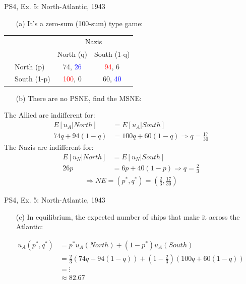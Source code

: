 \begin{frame}{PS4, Ex. 5: North-Atlantic, 1943}
    \begin{itemize}
      \item[(a)] It's a zero-sum (100-sum) type game:
    \end{itemize}
    \vspace{-15pt}
    \hspace{-15pt}\begin{table}
      \begin{tabular}{cl|c|c|}
          & \multicolumn{1}{c}{} & \multicolumn{2}{c}{\color{blue}Nazis}\\
          \parbox[t]{1mm}{}
          &  &  &  \\
          & North (p)    & 74, \textcolor{blue}{26} & \textcolor{red}{94}, 6 \\
          & South (1-p)  & \textcolor{red}{100}, 0 & 60, \textcolor{blue}{40} \\
      \end{tabular}
    \end{table}
    \begin{itemize}
      \item[(b)] There are no PSNE, find the MSNE:
    \end{itemize}
    The Allied are indifferent for:
    \begin{align*}
      E[u_A|North]&=E[u_A|South]\\
      74q + 94(1-q) &= 100q + 60(1-q) \Rightarrow q = \frac{17}{30}
    \end{align*}
    The Nazis are indifferent for:
    \begin{align*}
      E[u_N|North]&=E[u_N|South]\\
      26p &= 6p + 40(1-p) \Rightarrow q = \frac{2}{3}
    \end{align*}
    \begin{align*}
      \Rightarrow NE=(p^{*},q^{*})=\left(\frac{2}{3},\frac{17}{30}\right)
    \end{align*}
\end{frame}
\begin{frame}{PS4, Ex. 5: North-Atlantic, 1943}
  \begin{itemize}
    \item[(c)] In equilibrium, the expected number of ships that make it across the Atlantic:
  \end{itemize}
  \begin{align*}
     u_A(p^{*},q^{*}) &= p^{*}u_A(North)+(1-p^{*})u_A(South)\\
     &= \frac{2}{3}(74q + 94(1-q)) + \left(1-\frac{2}{3}\right)(100q + 60(1-q)) \\
     &= \vdots \\
     &\approx 82.67
  \end{align*}
\end{frame}


